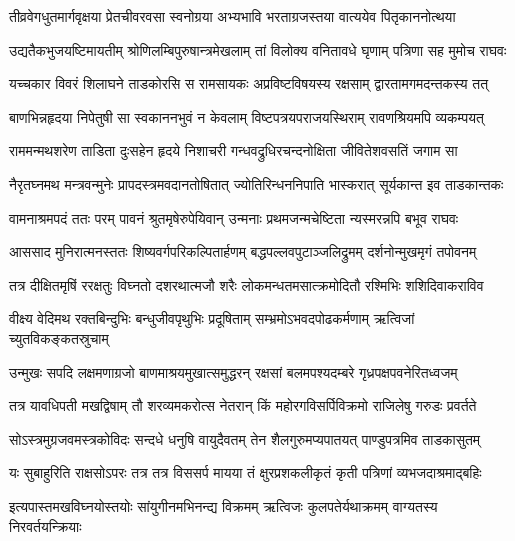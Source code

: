 \fourlineindentedshloka
{तीव्रवेगधुतमार्गवृक्षया}
{प्रेतचीवरवसा स्वनोग्रया}
{अभ्यभावि भरताग्रजस्तया}
{वात्ययेव पितृकाननोत्थया} %

\fourlineindentedshloka
{उद्यतैकभुजयष्टिमायतीम्}
{श्रोणिलम्बिपुरुषान्त्रमेखलाम्}
{तां विलोक्य वनितावधे घृणाम्}
{पत्रिणा सह मुमोच राघवः} %

\fourlineindentedshloka
{यच्चकार विवरं शिलाघने}
{ताडकोरसि स रामसायकः}
{अप्रविष्टविषयस्य रक्षसाम्}
{द्वारतामगमदन्तकस्य तत्} %

\fourlineindentedshloka
{बाणभिन्नहृदया निपेतुषी}
{सा स्वकाननभुवं न केवलाम्}
{विष्टपत्रयपराजयस्थिराम्}
{रावणश्रियमपि व्यकम्पयत्} %

\fourlineindentedshloka
{राममन्मथशरेण ताडिता}
{दुःसहेन हृदये निशाचरी}
{गन्धवद्रुधिरचन्दनोक्षिता}
{जीवितेशवसतिं जगाम सा} %

\fourlineindentedshloka
{नैरृतघ्नमथ मन्त्रवन्मुनेः}
{प्रापदस्त्रमवदानतोषितात्}
{ज्योतिरिन्धननिपाति भास्करात्}
{सूर्यकान्त इव ताडकान्तकः} %

\fourlineindentedshloka
{वामनाश्रमपदं ततः परम्}
{पावनं श्रुतमृषेरुपेयिवान्}
{उन्मनाः प्रथमजन्मचेष्टिता}
{न्यस्मरन्नपि बभूव राघवः} %

\fourlineindentedshloka
{आससाद मुनिरात्मनस्ततः}
{शिष्यवर्गपरिकल्पितार्हणम्}
{बद्धपल्लवपुटाञ्जलिद्रुमम्}
{दर्शनोन्मुखमृगं तपोवनम्} %

\fourlineindentedshloka
{तत्र दीक्षितमृषिं ररक्षतुः}
{विघ्नतो दशरथात्मजौ शरैः}
{लोकमन्धतमसात्क्रमोदितौ}
{रश्मिभिः शशिदिवाकराविव} %

\fourlineindentedshloka
{वीक्ष्य वेदिमथ रक्तबिन्दुभिः}
{बन्धुजीवपृथुभिः प्रदूषिताम्}
{सम्भ्रमोऽभवदपोढकर्मणाम्}
{ऋत्विजां च्युतविकङ्कतस्रुचाम्} %

\fourlineindentedshloka
{उन्मुखः सपदि लक्षमणाग्रजो}
{बाणमाश्रयमुखात्समुद्धरन्}
{रक्षसां बलमपश्यदम्बरे}
{गृध्रपक्षपवनेरितध्वजम्} %

\fourlineindentedshloka
{तत्र यावधिपती मखद्विषाम्}
{तौ शरव्यमकरोत्स नेतरान्}
{किं महोरगविसर्पिविक्रमो}
{राजिलेषु गरुडः प्रवर्तते} %

\fourlineindentedshloka
{सोऽस्त्रमुग्रजवमस्त्रकोविदः}
{सन्दधे धनुषि वायुदैवतम्}
{तेन शैलगुरुमप्यपातयत्}
{पाण्डुपत्रमिव ताडकासुतम्} %

\fourlineindentedshloka
{यः सुबाहुरिति राक्षसोऽपरः}
{तत्र तत्र विससर्प मायया}
{तं क्षुरप्रशकलीकृतं कृती}
{पत्रिणां व्यभजदाश्रमाद्बहिः} %

\fourlineindentedshloka
{इत्यपास्तमखविघ्नयोस्तयोः}
{सांयुगीनमभिनन्द्य विक्रमम्}
{ऋत्विजः कुलपतेर्यथाक्रमम्}
{वाग्यतस्य निरवर्तयन्क्रियाः} %

